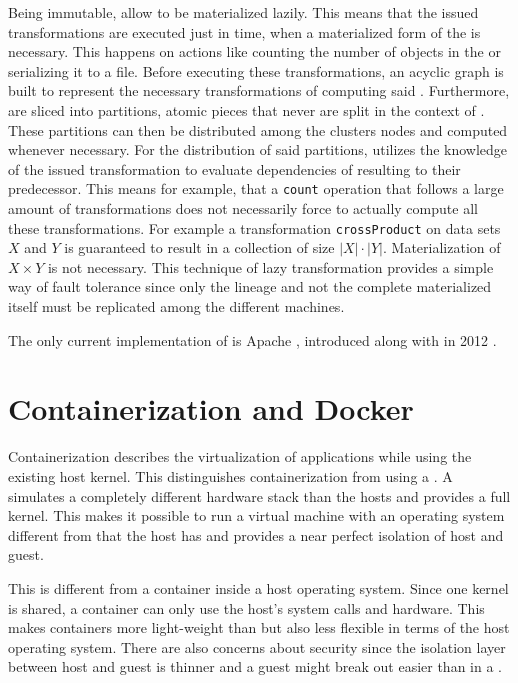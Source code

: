 Being immutable, \rdds{} allow to be materialized lazily. This means that the issued transformations are executed just in time, when a materialized form of the \rdd{} is necessary. This happens on actions like counting the number of objects in the \rdd{} or serializing it to a file. Before executing these transformations, an acyclic graph is built to represent the necessary transformations of computing said \rdd{}. Furthermore, \rdds{} are sliced into partitions, atomic pieces that never are split in the context of \spark{}. These partitions can then be distributed among the clusters nodes and computed whenever necessary. For the distribution of said partitions, \spark{} utilizes the knowledge of the issued transformation to evaluate dependencies of resulting \rdds{} to their predecessor. This means for example, that a \lstinline|count| operation that follows a large amount of transformations does not necessarily force \spark{} to actually compute all these transformations. For example a transformation \lstinline|crossProduct| on data sets $X$ and $Y$ is guaranteed to result in a collection of size $|X|\cdot{}|Y|$. Materialization of $X\times{}Y$ is not necessary. This technique of lazy transformation provides a simple way of fault tolerance since only the \rdd{} lineage and not the complete materialized \rdd{} itself must be replicated among the different machines.

The only current implementation of \rdds{} is Apache \spark{}, introduced along with \rdds{} in 2012 \cite{zaharia2012resilient}.

\section{Containerization and Docker}
Containerization describes the virtualization of applications while using the existing host kernel. This distinguishes containerization from using a \vm{}. A \vm{} simulates a completely different hardware stack than the hosts and provides a full kernel. This makes it possible to run a virtual machine with an operating system different from that the host has and provides a near perfect isolation of host and guest.

This is different from a container inside a host operating system. Since one kernel is shared, a container can only use the host's system calls and hardware. This makes containers more light-weight than \vms{} but also less flexible in terms of the host operating system. There are also concerns about security since the isolation layer between host and guest is thinner and a guest might break out easier than in a \vm{} \cite{turnbull2014docker,jian2017defense}.

